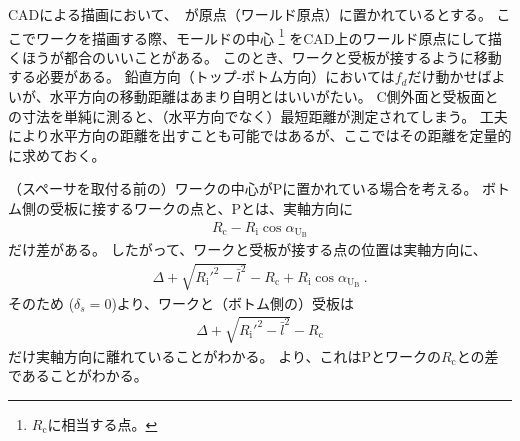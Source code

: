 

CADによる描画において、\TableCenter　が原点（ワールド原点）に置かれているとする。
ここでワークを描画する際、モールドの中心
\footnote{$R_\mathrm c$に相当する点。}\relax
をCAD上のワールド原点にして描くほうが都合のいいことがある。
このとき、ワークと受板が接するように移動する必要がある。
鉛直方向（トップ-ボトム方向）においては$f_d$だけ動かせばよいが、水平方向の移動距離はあまり自明とはいいがたい。
C側外面と受板面との寸法を単純に測ると、（水平方向でなく）最短距離が測定されてしまう。
工夫により水平方向の距離を出すことも可能ではあるが、ここではその距離を定量的に求めておく。



（スペーサを取付る前の）ワークの中心が\TableCenter Pに置かれている場合を考える。
ボトム側の受板に接するワークの点と、\TableCenter Pとは、実軸方向に
\begin{align*}
  R_\mathrm c-R_\mathrm i\cos\alpha_{\mathrm U_\mathrm B}
\end{align*}
だけ差がある。
したがって、ワークと受板が接する点の位置は実軸方向に、
\begin{align*}
  \Delta+\sqrt{R_\mathrm i'^2-\bar l^2}-R_\mathrm c+R_\mathrm i\cos\alpha_{\mathrm U_\mathrm B}\ .
\end{align*}
そのため ($\delta_s = 0$)より、ワークと（ボトム側の）受板は
\begin{align*}
  \Delta+\sqrt{R_\mathrm i'^2-\bar l^2}-R_\mathrm c
\end{align*}
だけ実軸方向に離れていることがわかる。
より、これは\TableCenter Pとワークの\CenterCurvature$R_\mathrm c$との差であることがわかる。




